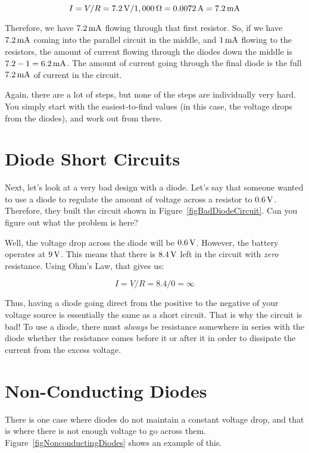$$ I = V / R = 7.2\,\si{\volt} / 1,000\,\si{\ohm} = 0.0072\,\si{\ampere} = 7.2\,\si{\milli\ampere} $$

Therefore, we have $7.2\,\si{\milli\ampere}$ flowing through that first resistor.
So, if we have $7.2\,\si{\milli\ampere}$ coming into the parallel circuit in the middle, and $1\,\si{\milli\ampere}$ flowing to the resistors, the amount of current flowing through the diodes down the middle is $7.2 - 1 = 6.2\,\si{\milli\ampere}$.
The amount of current going through the final diode is the full $7.2\,\si{\milli\ampere}$ of current in the circuit.

Again, there are a lot of steps, but none of the steps are individually very hard.
You simply start with the easiest-to-find values (in this case, the voltage drops from the diodes), and work out from there.

\section{Diode Short Circuits}

Next, let's look at a very bad design with a diode.
Let's say that someone wanted to use a diode to regulate the amount of voltage across a resistor to $0.6\,\si{\volt}$.
Therefore, they built the circuit shown in Figure~\ref{figBadDiodeCircuit}.
Can you figure out what the problem is here?


Well, the voltage drop across the diode will be $0.6\,\si{\volt}$.
However, the battery operates at $9\,\si{\volt}$.  
This means that there is $8.4\,\si{\volt}$ left in the circuit with \emph{zero} resistance.
Using Ohm's Law, that gives us:

$$ I = V / R = 8.4 / 0 = \infty $$

Thus, having a diode going direct from the positive to the negative of your voltage source is essentially the same as a short circuit.  
That is why the circuit is bad!
To use a diode, there must \emph{always} be resistance somewhere in series with the diode whether the resistance comes before it or after it in order to dissipate the current from the excess voltage.

\section{Non-Conducting Diodes}

There is one case where diodes do not maintain a constant voltage drop, and that is where there is not enough voltage to go across them.
Figure~\ref{figNonconductingDiodes} shows an example of this.

